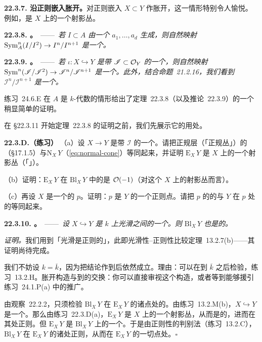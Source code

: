 \textbf{22.3.7. 沿正则嵌入胀开。}\quad 对正则嵌入 $X\subset Y$ 作胀开，这一情形特别令人愉悦。例如，\trExceptionalDivisor{}是 $X$ 上的一个射影丛。

\textbf{22.3.8. \trhTheorem。}\ ——\ \emph{若 $I\subset A$ 由一个\trRegularSequence{} $a_1,\dots,a_d$ 生成，则自然映射 $\operatorname{Sym}^n_A(I/I^2)\to I^n/I^{n+1}$ 是一个\trIsomorphism。}

\textbf{22.3.9. \trhCorollary。}\ ——\ \emph{若\trClosedEmbedding{} $\iota\colon X\hookrightarrow Y$ 是带\trIdealSheaf{} $\mathscr{I}\subset\mathcal{O}_Y$ 的一个\trRegularEmbedding，则自然映射 $\operatorname{Sym}^n(\mathscr{I}/\mathscr{I}^2)\to\mathscr{I}^n/\mathscr{I}^{n+1}$ 是一个\trIsomorphism。此外，结合\mbox{命题~21.2.16}，我们看到 $\mathscr{I}^n/\mathscr{I}^{n+1}$ 是一个\trLocallyFreeSheaf。}

\mbox{练习~24.6.E} 在 $A$ 是 $k$-代数的情形给出了\mbox{定理~22.3.8}（以及\mbox{推论~22.3.9}）的一个稍显简单的证明。

在 \S22.3.11 开始\mbox{定理~22.3.8} 的证明之前，我们先展示它的用处。

\textbf{22.3.D.（练习）}\quad
（a）设 $X\to Y$ 是带\trIdealSheaf{} $\mathscr{I}$ 的一个\trRegularEmbedding。请把正规层（「正规丛」）的\trTotalSpace（\S17.1.5）与\trNormal\trCone $\mathrm{N}_X\,Y$（\eqref{eq:normal-cone}）等同起来，并证明\trExceptionalDivisor{} $\mathrm{E}_X\,Y$ 是 $X$ 上的一个射影丛（「\trProjectivization\trNormalBundle」）。

（b）证明：$\mathrm{E}_X\,Y$ 在 $\mathrm{Bl}_X\,Y$ 中的\trNormalBundle{}是 $\mathcal{O}(-1)$（对这个 $X$ 上的射影丛而言）。

（c）再设 $X$ 是一个\trReduced{}的\trClosedPoint{} $p$。证明：$p$ 是 $Y$ 的一个正则点。请把 $p$ 的\trTangentSpace{}的\trTotalSpace{}与 $Y$ 在 $p$ 处的\trTangent\trCone{}等同起来。

\textbf{22.3.10. \trhTheorem。}\ ——\ \emph{设 $X\hookrightarrow Y$ 是 $k$ 上光滑\trVariety{}之间的一个\trClosedEmbedding。则 $\mathrm{Bl}_X\,Y$ 也是\trSmooth{}的。}

\emph{证明。}\quad 我们用到「光滑\trVariety{}是正则的」，此即\mbox{光滑性--正则性比较定理~13.2.7}(b)——其证明尚待完成。

我们不妨设 $k=\overline{k}$，因为把结论作\trBaseChange{}到\trAlgebraicClosure{}后依然成立。理由：\trSmoothness{}可以在\trBaseChange{}到 $\overline{k}$ 之后检验，\mbox{练习~13.2.H}。胀开构造与到\trAlgebraicClosure{}的\trBaseChange{}交换：你可以直接审视这个构造，或者等到能够援引\mbox{练习~24.1.P}(a) 中的推广。

由\mbox{观察~22.2.2}，只须检验 $\mathrm{Bl}_X\,Y$ 在 $\mathrm{E}_X\,Y$ 的诸点处的\trSmoothness。由\mbox{练习~13.2.M}(b)，$X\hookrightarrow Y$ 是一个\trRegularEmbedding。那么由\mbox{练习~22.3.D}(a)，$\mathrm{E}_X\,Y$ 是 $X$ 上的一个射影丛，从而是\trSmooth{}的，进而在其\trClosedPoint{}处正则。但 $\mathrm{E}_X\,Y$ 是 $\mathrm{Bl}_X\,Y$ 上的一个\trEffectiveCartierDivisor。于是由正则性的\trSlicing{}判别法（\mbox{练习~13.2.C}），$\mathrm{Bl}_X\,Y$ 在 $\mathrm{E}_X\,Y$ 的诸\trClosedPoint{}处正则，从而在 $\mathrm{E}_X\,Y$ 的一切点处\trSmooth。\hfill$\square$

